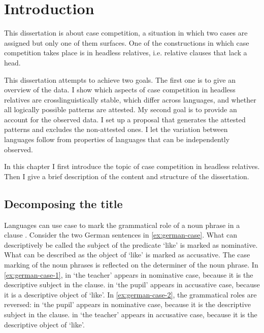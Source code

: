 
\chapter{Introduction}\label{ch:introduction}

This dissertation is about case competition, a situation in which two cases are assigned but only one of them surfaces. One of the constructions in which case competition takes place is in headless relatives, i.e. relative clauses that lack a head.

This dissertation attempts to achieve two goals. The first one is to give an overview of the data. I show which aspects of case competition in headless relatives are crosslinguistically stable, which differ across languages, and whether all logically possible patterns are attested. My second goal is to provide an account for the observed data. I set up a proposal that generates the attested patterns and excludes the non-attested ones. I let the variation between languages follow from properties of languages that can be independently observed.

In this chapter I first introduce the topic of case competition in headless relatives.
Then I give a brief description of the content and structure of the dissertation.


\section{Decomposing the title}

Languages can use case to mark the grammatical role of a noun phrase in a clause \citep[cf.][]{moravcsik2009}. Consider the two German sentences in \ref{ex:german-case}. What can descriptively be called the subject of the predicate  `like' is marked as nominative. What can be described as the object of  `like' is marked as accusative. The case marking of the noun phrases is reflected on the determiner of the noun phrase.
In \ref{ex:german-case-1},  in  `the teacher' appears in nominative case, because it is the descriptive subject in the clause.  in  `the pupil' appears in accusative case, because it is a descriptive object of  `like'.
In \ref{ex:german-case-2}, the grammatical roles are reversed:  in  `the pupil' appears in nominative case, because it is the descriptive subject in the clause.  in  `the teacher' appears in accusative case, because it is the descriptive object of  `like'.

